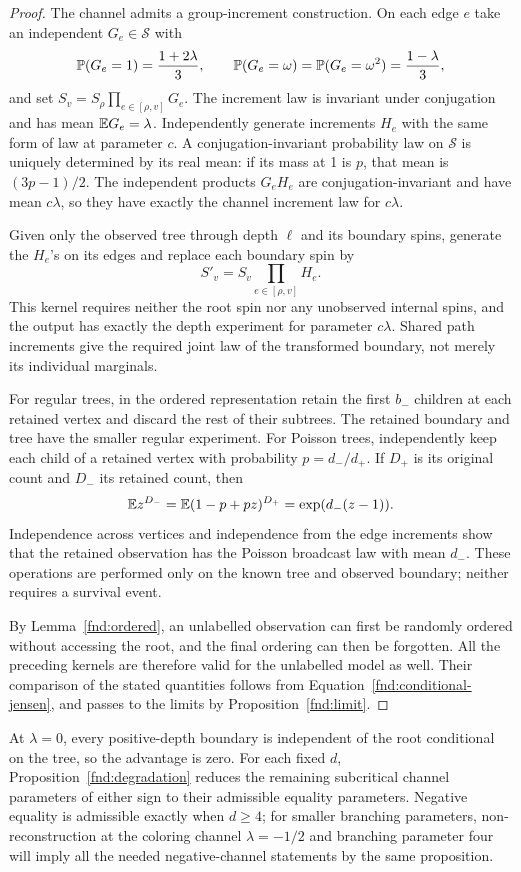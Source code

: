 \begin{proof}
The channel admits a group-increment construction.  On each edge \(e\)
take an independent \(G_e\in\mathcal S\) with
\[
 \mathbb P(G_e=1)=\frac{1+2\lambda}{3},\qquad
 \mathbb P(G_e=\omega)=\mathbb P(G_e=\omega^2)=\frac{1-\lambda}{3},
\]
and set \(S_v=S_\rho\prod_{e\in[\rho,v]}G_e\).
The increment law is invariant under conjugation and has mean
\(\mathbb E G_e=\lambda\).  Independently generate increments \(H_e\)
with the same form of law at parameter \(c\).  A conjugation-invariant
probability law on \(\mathcal S\) is uniquely determined by its real
mean: if its mass at 1 is \(p\), that mean is \((3p-1)/2\).
The independent products \(G_eH_e\) are conjugation-invariant and
have mean \(c\lambda\), so they have exactly the channel increment
law for \(c\lambda\).

Given only the observed tree through depth \(\ell\) and its boundary
spins, generate the \(H_e\)'s on its edges and replace each boundary
spin by
\[
 S'_v=S_v\prod_{e\in[\rho,v]}H_e.
\]
This kernel requires neither the root spin nor any unobserved internal
spins, and the output has exactly the depth experiment for parameter
\(c\lambda\).  Shared path increments give the required joint law
of the transformed boundary, not merely its individual marginals.

For regular trees, in the ordered representation retain the first
\(b_-\) children at each retained vertex and discard the rest of
their subtrees.  The retained boundary and tree have the smaller regular
experiment.  For Poisson trees, independently keep each child of a
retained vertex with probability \(p=d_-/d_+\).  If \(D_+\) is its
original count and \(D_-\) its retained count, then
\[
 \mathbb E z^{D_-}=\mathbb E(1-p+pz)^{D_+}
             =\exp(d_-(z-1)).
\]
Independence across vertices and independence from the edge increments
show that the retained observation has the Poisson broadcast law with
mean \(d_-\).  These operations are performed only on the known tree
and observed boundary; neither requires a survival event.

By Lemma~\ref{fnd:ordered}, an unlabelled observation can first be
randomly ordered without accessing the root, and the final ordering
can then be forgotten.  All the preceding kernels are therefore valid
for the unlabelled model as well.  Their comparison of the stated
quantities follows from Equation~\eqref{fnd:conditional-jensen}, and
passes to the limits by Proposition~\ref{fnd:limit}.
\end{proof}

At \(\lambda=0\), every positive-depth boundary is independent of
the root conditional on the tree, so the advantage is zero.  For each
fixed \(d\), Proposition~\ref{fnd:degradation} reduces the remaining
subcritical channel parameters of either sign to their admissible
equality parameters.  Negative equality is admissible exactly when
\(d\geq4\); for smaller branching parameters, non-reconstruction at
the coloring channel \(\lambda=-1/2\) and branching parameter four
will imply all the needed negative-channel statements by the same
proposition.
